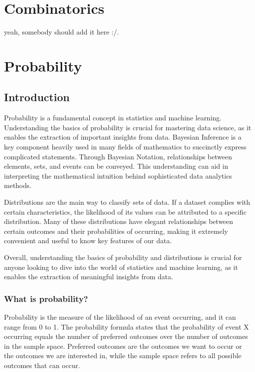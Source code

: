 \documentclass{article}
\begin{document}
\tableofcontents

\section{Combinatorics}
yeah, somebody should add it here :/.

\section{Probability}
\subsection{Introduction}
Probability is a fundamental concept in statistics and machine learning.
Understanding the basics of probability is crucial for mastering data science,
as it enables the extraction of important insights from data. Bayesian
Inference is a key component heavily used in many fields of mathematics to
succinctly express complicated statements. Through Bayesian Notation,
relationships between elements, sets, and events can be conveyed. This
understanding can aid in interpreting the mathematical intuition behind
sophisticated data analytics methods.

Distributions are the main way to classify sets of data. If a dataset complies
with certain characteristics, the likelihood of its values can be attributed to
a specific distribution. Many of these distributions have elegant relationships
between certain outcomes and their probabilities of occurring, making it
extremely convenient and useful to know key features of our data.

Overall, understanding the basics of probability and distributions is crucial
for anyone looking to dive into the world of statistics and machine learning,
as it enables the extraction of meaningful insights from data.

\subsubsection{What is probability?}
Probability is the measure of the likelihood of an event occurring, and it can
range from 0 to 1. The probability formula states that the probability of event
X occurring equals the number of preferred outcomes over the number of outcomes
in the sample space. Preferred outcomes are the outcomes we want to occur or
the outcomes we are interested in, while the sample space refers to all
possible outcomes that can occur.
\end{document}
